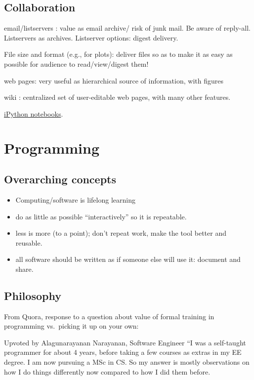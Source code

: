 \documentclass{article}
\begin{document}
\subsection{Collaboration}

email/listservers : value as email archive/ risk of junk mail. Be
aware of reply-all. Listservers as archives. Listserver options:
digest delivery.

File size and format (e.g., for plots): deliver files so as to make it
as easy as possible for audience to read/view/digest them!

web pages: very useful as hierarchical source of information, with
figures

wiki : centralized set of user-editable web pages, with many other
features\@.

\href{http://astronomy.nmsu.edu/holtz/a575/ipynb.html}
{iPython notebooks}.

\newpage
\section{Programming}
\subsection{Overarching concepts}
\begin{itemize}
    \item Computing/software is lifelong learning
    \item do as little as possible ``interactively'' so it is
        repeatable.
    \item less is more (to a point); don't repeat work, make the tool
        better and reusable.
    \item all software should be written as if someone else will use
        it: document and share.
\end{itemize}
\subsection{Philosophy}
From Quora, response to a question about value of formal training in
programming vs.\ picking it up on your own:

Upvoted by Alagunarayanan Narayanan, Software Engineer ``I was a
self-taught programmer for about 4 years, before taking a few courses
as extras in my EE degree. I am now pursuing a MSc in CS\@. So my answer
is mostly observations on how I do things differently now compared to
how I did them before.
\end{document}
